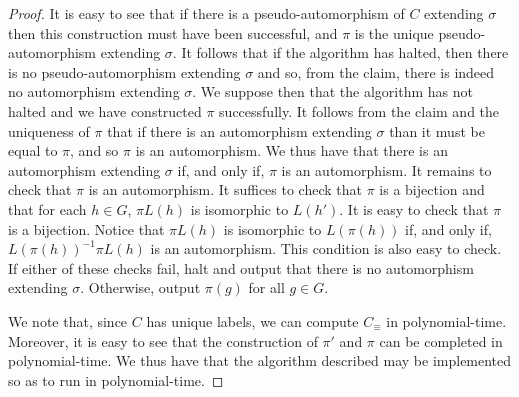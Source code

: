 \documentclass[../paper.tex]{subfiles}
\begin{document}
\begin{proof}
It is easy to see that if there is a pseudo-automorphism of $C$ extending
$\sigma$ then this construction must have been successful, and $\pi$ is the
unique pseudo-automorphism extending $\sigma$. It follows that if the algorithm
has halted, then there is no pseudo-automorphism extending $\sigma$ and so, from
the claim, there is indeed no automorphism extending $\sigma$. We suppose then
that the algorithm has not halted and we have constructed $\pi$ successfully. It
follows from the claim and the uniqueness of $\pi$ that if there is an
automorphism extending $\sigma$ than it must be equal to $\pi$, and so $\pi$ is
an automorphism. We thus have that there is an automorphism extending $\sigma$
if, and only if, $\pi$ is an automorphism.  It remains to check that $\pi$ is an
automorphism.  It suffices to check that $\pi$ is a bijection and that for each
$h \in G$, $\pi L(h)$ is isomorphic to $L(h')$. It is easy to check
that $\pi$ is a bijection.  Notice that $\pi L(h)$ is isomorphic to
$L(\pi(h))$ if, and only if, $L(\pi(h))^{-1}\pi L(h)$ is an automorphism. This
condition is also easy to check.  If either of these checks fail, halt and output
that there is no automorphism extending $\sigma$.  Otherwise, output $\pi (g)$
for all $g \in G$.

We note that, since $C$ has unique labels, we can compute $C_\equiv$ in
polynomial-time. Moreover, it is easy to see that the construction of $\pi'$ and
$\pi$ can be completed in polynomial-time. We thus have that the algorithm
described may be implemented so as to run in polynomial-time.
\end{proof}


\end{document}
